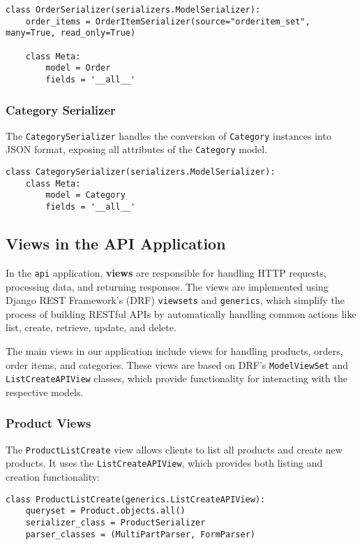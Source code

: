 \begin{verbatim}
class OrderSerializer(serializers.ModelSerializer):
    order_items = OrderItemSerializer(source="orderitem_set", many=True, read_only=True)  

    class Meta:
        model = Order
        fields = '__all__'
\end{verbatim}

\subsubsection{Category Serializer}
The \texttt{CategorySerializer} handles the conversion of \texttt{Category} instances into JSON format, exposing all attributes of the \texttt{Category} model.

\begin{verbatim}
class CategorySerializer(serializers.ModelSerializer):
    class Meta:
        model = Category
        fields = '__all__'
\end{verbatim}

\subsection{Views in the API Application}

In the \texttt{api} application, \textbf{views} are responsible for handling HTTP requests, processing data, and returning responses. The views are implemented using Django REST Framework's (DRF) \texttt{viewsets} and \texttt{generics}, which simplify the process of building RESTful APIs by automatically handling common actions like list, create, retrieve, update, and delete.

The main views in our application include views for handling products, orders, order items, and categories. These views are based on DRF's \texttt{ModelViewSet} and \texttt{ListCreateAPIView} classes, which provide functionality for interacting with the respective models.

\subsubsection{Product Views}
The \texttt{ProductListCreate} view allows clients to list all products and create new products. It uses the \texttt{ListCreateAPIView}, which provides both listing and creation functionality:

\begin{verbatim}
class ProductListCreate(generics.ListCreateAPIView):
    queryset = Product.objects.all()
    serializer_class = ProductSerializer
    parser_classes = (MultiPartParser, FormParser)
\end{verbatim}

